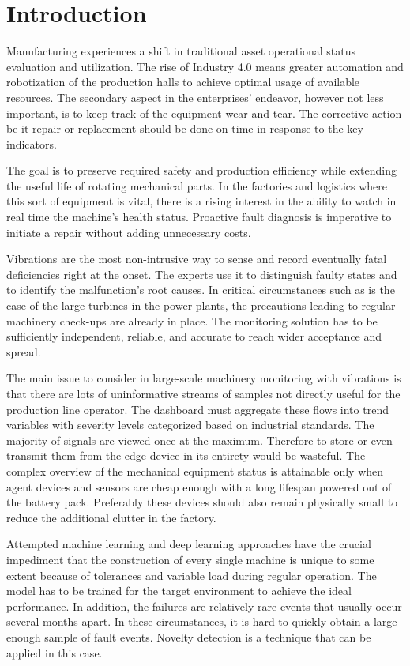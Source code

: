 \chapter{Introduction}
Manufacturing experiences a shift in traditional asset operational status evaluation and utilization. The rise of Industry 4.0 means greater automation and robotization of the production halls to achieve optimal usage of available resources. The secondary aspect in the enterprises' endeavor, however not less important, is to keep track of the equipment wear and tear. The corrective action be it repair or replacement should be done on time in response to the key indicators.

The goal is to preserve required safety and production efficiency while extending the useful life of rotating mechanical parts. In the factories and logistics where this sort of equipment is vital, there is a rising interest in the ability to watch in real time the machine's health status. Proactive fault diagnosis is imperative to initiate a repair without adding unnecessary costs.

Vibrations are the most non-intrusive way to sense and record eventually fatal deficiencies right at the onset. The experts use it to distinguish faulty states and to identify the malfunction's root causes. In critical circumstances such as is the case of the large turbines in the power plants, the precautions leading to regular machinery check-ups are already in place. The monitoring solution has to be sufficiently independent, reliable, and accurate to reach wider acceptance and spread.

The main issue to consider in large-scale machinery monitoring with vibrations is that there are lots of uninformative streams of samples not directly useful for the production line operator. The dashboard must aggregate these flows into trend variables with severity levels categorized based on industrial standards. The majority of signals are viewed once at the maximum. Therefore to store or even transmit them from the edge device in its entirety would be wasteful. The complex overview of the mechanical equipment status is attainable only when agent devices and sensors are cheap enough with a long lifespan powered out of the battery pack. Preferably these devices should also remain physically small to reduce the additional clutter in the factory.

Attempted machine learning and deep learning approaches have the crucial impediment that the construction of every single machine is unique to some extent because of tolerances and variable load during regular operation. The model has to be trained for the target environment to achieve the ideal performance. In addition, the failures are relatively rare events that usually occur several months apart. In these circumstances, it is hard to quickly obtain a large enough sample of fault events. Novelty detection is a technique that can be applied in this case.

